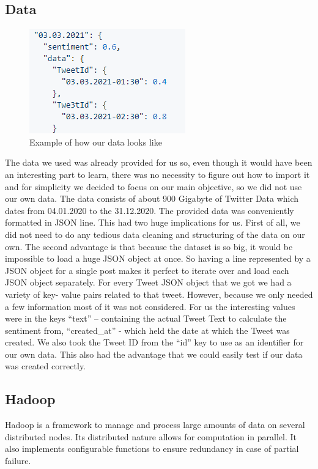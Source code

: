 \documentclass[
    fontsize=12pt,
    headings=small,
    parskip=half,           %
    bibliography=totoc,
    numbers=noenddot,       %
    open=any,               %
    ]{scrreprt}
\begin{document}
\subsection{Data}


\begin{figure}[h]
    \centering
    \includegraphics[]{data_structure.png}
    \caption{Example of how our data looks like}
\end{figure}

The data we used was already provided for us so, even though it would have been an interesting part to learn, there was no necessity to figure out how to import it and for simplicity we decided to focus on our main objective, so we did not use our own data. The data consists of about 900 Gigabyte of Twitter Data which dates from 04.01.2020 to the 31.12.2020. The provided data was conveniently formatted in JSON line. This had two huge implications for us. First of all, we did not need to do any tedious data cleaning and structuring of the data on our own. The second advantage is that because the dataset is so big, it would be impossible to load a huge JSON object at once. So having a line represented by a JSON object for a single post makes it perfect to iterate over and load each JSON object separately. For every Tweet JSON object that we got we had a variety of key- value pairs related to that tweet. However, because we only needed a few information most of it was not considered. For us the interesting values were in the keys “text” – containing the actual Tweet Text to calculate the sentiment from, “created\_at” -  which held the date at which the Tweet was created. We also took the Tweet ID from the “id” key to use as an identifier for our own data. This also had the advantage that we could easily test if our data was created correctly. 

\subsection{Hadoop}

Hadoop is a framework to manage and process large amounts of data on several distributed nodes. Its distributed nature allows for computation in parallel. It also implements configurable functions to ensure redundancy in case of partial failure.
\end{document}
